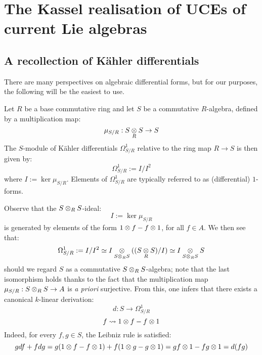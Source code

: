 \section{The Kassel realisation of UCEs of current Lie algebras}
    \subsection{A recollection of K\"ahler differentials}
        There are many perspectives on algebraic differential forms, but for our purposes, the following will be the easiest to use.
        \begin{definition} \label{def: kahler_differentials}
            Let $R$ be a base commutative ring and let $S$ be a commutative $R$-algebra, defined by a multiplication map:
                $$\mu_{S/R}: S \tensor_R S \to S$$
            The $S$-module of K\"ahler differentials $\Omega^1_{S/R}$ relative to the ring map $R \to S$ is then given by:
                $$\Omega^1_{S/R} := I/I^2$$
            where $I := \ker \mu_{S/R}$. Elements of $\Omega^1_{S/R}$ are typically referred to as (differential) $1$-forms.
        \end{definition}
        \begin{remark}
            Observe that the $S \tensor_R S$-ideal:
                $$I := \ker \mu_{S/R}$$
            is generated by elements of the form $1 \tensor f - f \tensor 1$, for all $f \in A$. We then see that:
                $$\Omega^1_{S/R} := I/I^2 \cong I \tensor_{S \tensor_R S} ( (S \tensor_R S)/I ) \cong I \tensor_{S \tensor_R S} S$$
            should we regard $S$ as a commutative $S \tensor_R S$-algebra; note that the last isomorphism holds thanks to the fact that the multiplication map $\mu_{S/R}: S \tensor_R S \to A$ is \textit{a priori} surjective. From this, one infers that there exists a canonical $k$-linear derivation:
                $$d: S \to \Omega^1_{S/R}$$
                $$f \mapsto 1 \tensor f - f \tensor 1$$
            Indeed, for every $f, g \in S$, the Leibniz rule is satisfied:
                $$g df + f dg = g(1 \tensor f - f \tensor 1) + f(1 \tensor g - g \tensor 1) = gf \tensor 1 - fg \tensor 1 = d(fg)$$
        \end{remark}
        

